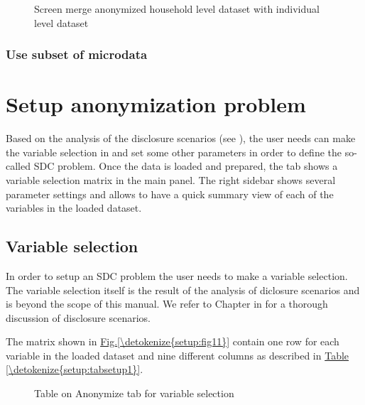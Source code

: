 \documentclass[letterpaper,10pt,english]{sphinxmanual}
\begin{document}
\begin{figure}[htbp]
\centering
\capstart

\noindent{}
\caption{Screen merge anonymized household level dataset with individual level dataset}\label{\detokenize{loadprepdata:fig510}}\label{\detokenize{loadprepdata:id10}}\end{figure}


\subsection{Use subset of microdata}
\label{\detokenize{loadprepdata:use-subset-of-microdata}}

\chapter{Setup anonymization problem}
\label{\detokenize{setup::doc}}\label{\detokenize{setup:setup-anonymization-problem}}
Based on the analysis of the disclosure scenarios (see ), the user needs can make the variable
selection in  and set some other parameters in order to define the
so-called SDC problem. Once the data is loaded and prepared,
the tab  shows a variable selection matrix in the main panel. The right sidebar
shows several parameter settings and allows to have a quick summary view of each of the variables
in the loaded dataset.


\section{Variable selection}
\label{\detokenize{setup:variable-selection}}
In order to setup an SDC problem the user needs to make a variable selection. The variable
selection itself is the result of the analysis of diclosure scenarios and is beyond the scope
of this manual. We refer to Chapter in for a thorough discussion of disclosure scenarios.

The matrix shown in \hyperref[\detokenize{setup:fig11}]{Fig.\@ \ref{\detokenize{setup:fig11}}} contain one row for each variable in the loaded dataset
and nine different columns as described in \hyperref[\detokenize{setup:tabsetup1}]{Table \ref{\detokenize{setup:tabsetup1}}}.

\begin{figure}[htbp]
\centering
\capstart

\noindent{}
\caption{Table on Anonymize tab for variable selection}\label{\detokenize{setup:fig11}}\label{\detokenize{setup:id1}}\end{figure}
\end{document}
